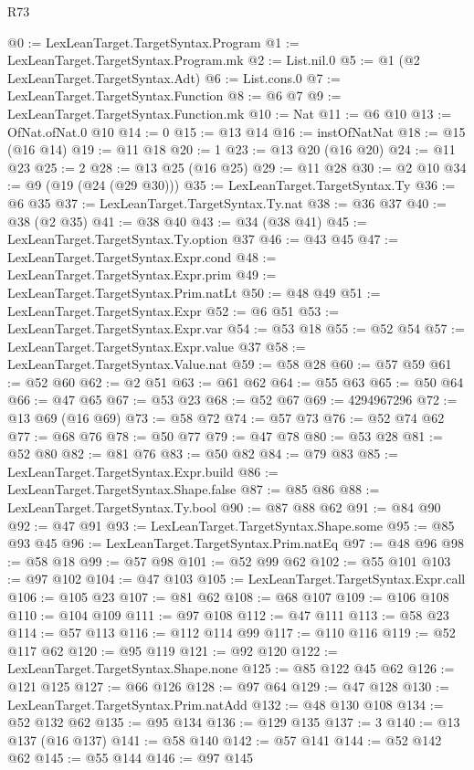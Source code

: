 \begin{lexlean}{R73}
\begin{coremodule}
@0 := LexLeanTarget.TargetSyntax.Program
@1 := LexLeanTarget.TargetSyntax.Program.mk
@2 := List.nil.{0}
@5 := @1 (@2 LexLeanTarget.TargetSyntax.Adt)
@6 := List.cons.{0}
@7 := LexLeanTarget.TargetSyntax.Function
@8 := @6 @7
@9 := LexLeanTarget.TargetSyntax.Function.mk
@10 := Nat
@11 := @6 @10
@13 := OfNat.ofNat.{0} @10
@14 := 0
@15 := @13 @14
@16 := instOfNatNat
@18 := @15 (@16 @14)
@19 := @11 @18
@20 := 1
@23 := @13 @20 (@16 @20)
@24 := @11 @23
@25 := 2
@28 := @13 @25 (@16 @25)
@29 := @11 @28
@30 := @2 @10
@34 := @9 (@19 (@24 (@29 @30)))
@35 := LexLeanTarget.TargetSyntax.Ty
@36 := @6 @35
@37 := LexLeanTarget.TargetSyntax.Ty.nat
@38 := @36 @37
@40 := @38 (@2 @35)
@41 := @38 @40
@43 := @34 (@38 @41)
@45 := LexLeanTarget.TargetSyntax.Ty.option @37
@46 := @43 @45
@47 := LexLeanTarget.TargetSyntax.Expr.cond
@48 := LexLeanTarget.TargetSyntax.Expr.prim
@49 := LexLeanTarget.TargetSyntax.Prim.natLt
@50 := @48 @49
@51 := LexLeanTarget.TargetSyntax.Expr
@52 := @6 @51
@53 := LexLeanTarget.TargetSyntax.Expr.var
@54 := @53 @18
@55 := @52 @54
@57 := LexLeanTarget.TargetSyntax.Expr.value @37
@58 := LexLeanTarget.TargetSyntax.Value.nat
@59 := @58 @28
@60 := @57 @59
@61 := @52 @60
@62 := @2 @51
@63 := @61 @62
@64 := @55 @63
@65 := @50 @64
@66 := @47 @65
@67 := @53 @23
@68 := @52 @67
@69 := 4294967296
@72 := @13 @69 (@16 @69)
@73 := @58 @72
@74 := @57 @73
@76 := @52 @74 @62
@77 := @68 @76
@78 := @50 @77
@79 := @47 @78
@80 := @53 @28
@81 := @52 @80
@82 := @81 @76
@83 := @50 @82
@84 := @79 @83
@85 := LexLeanTarget.TargetSyntax.Expr.build
@86 := LexLeanTarget.TargetSyntax.Shape.false
@87 := @85 @86
@88 := LexLeanTarget.TargetSyntax.Ty.bool
@90 := @87 @88 @62
@91 := @84 @90
@92 := @47 @91
@93 := LexLeanTarget.TargetSyntax.Shape.some
@95 := @85 @93 @45
@96 := LexLeanTarget.TargetSyntax.Prim.natEq
@97 := @48 @96
@98 := @58 @18
@99 := @57 @98
@101 := @52 @99 @62
@102 := @55 @101
@103 := @97 @102
@104 := @47 @103
@105 := LexLeanTarget.TargetSyntax.Expr.call
@106 := @105 @23
@107 := @81 @62
@108 := @68 @107
@109 := @106 @108
@110 := @104 @109
@111 := @97 @108
@112 := @47 @111
@113 := @58 @23
@114 := @57 @113
@116 := @112 @114 @99
@117 := @110 @116
@119 := @52 @117 @62
@120 := @95 @119
@121 := @92 @120
@122 := LexLeanTarget.TargetSyntax.Shape.none
@125 := @85 @122 @45 @62
@126 := @121 @125
@127 := @66 @126
@128 := @97 @64
@129 := @47 @128
@130 := LexLeanTarget.TargetSyntax.Prim.natAdd
@132 := @48 @130 @108
@134 := @52 @132 @62
@135 := @95 @134
@136 := @129 @135
@137 := 3
@140 := @13 @137 (@16 @137)
@141 := @58 @140
@142 := @57 @141
@144 := @52 @142 @62
@145 := @55 @144
@146 := @97 @145

\end{coremodule}
\end{lexlean}
